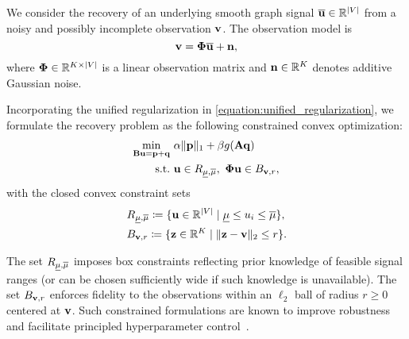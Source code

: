 We consider the recovery of an underlying smooth graph signal $\overline{\mathbf{u}} \in \mathbb{R}^{|V|}$ from a noisy and possibly incomplete observation $\mathbf{v}$. 
The observation model is
\begin{equation}
    \mathbf{v} = \mathbf{\Phi} \overline{\mathbf{u}} + \mathbf{n},
\end{equation}
where $\mathbf{\Phi} \in \mathbb{R}^{K \times |V|}$ is a linear observation matrix and $\mathbf{n} \in \mathbb{R}^K$ denotes additive Gaussian noise.

Incorporating the unified regularization in \eqref{equation:unified_regularization}, we formulate the recovery problem as the following constrained convex optimization:
\begin{align}
    \label{equation:proposed_optimization}
    \begin{split}
        \min_{\mathbf{B} \mathbf{u} = \mathbf{p} + \mathbf{q}} \ & \alpha \|\mathbf{p}\|_{1} + \beta g(\mathbf{A} \mathbf{q}) \\
        \text{s.t.} \ & \mathbf{u} \in R_{\underline{\mu}, \overline{\mu}}, \ \mathbf{\Phi} \mathbf{u} \in B_{\mathbf{v}, r},
    \end{split}
\end{align}
with the closed convex constraint sets
\begin{align}
    &R_{\underline{\mu}, \overline{\mu}} \coloneqq \{ \mathbf{u} \in \mathbb{R}^{|V|} \mid \underline{\mu} \leq u_i \leq \overline{\mu} \}, \\
    &B_{\mathbf{v}, r} \coloneqq \{ \mathbf{z} \in \mathbb{R}^K \mid \|\mathbf{z} - \mathbf{v}\|_{2} \leq r \}.
\end{align}

The set $R_{\underline{\mu}, \overline{\mu}}$ imposes box constraints reflecting prior knowledge of feasible signal ranges (or can be chosen sufficiently wide if such knowledge is unavailable). 
The set $B_{\mathbf{v}, r}$ enforces fidelity to the observations within an $\ell_2$ ball of radius $r \geq 0$ centered at $\mathbf{v}$. 
Such constrained formulations are known to improve robustness and facilitate principled hyperparameter control~\cite{afonso2010augmented,ono2015signal,chierchia2015epigraphical,ono2017primal,ono2017l_}.